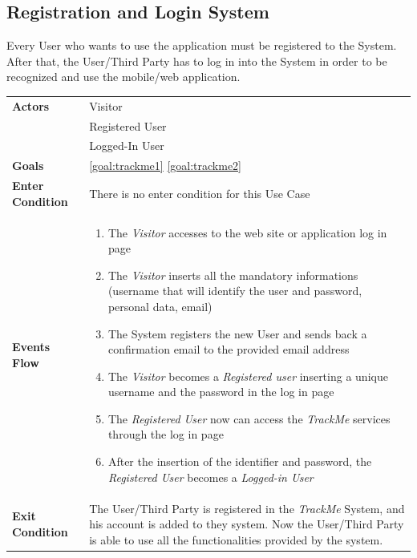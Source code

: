   \subsection{Registration and Login System}
Every User who wants to use the application must be registered to the System.
After that, the User/Third Party has to log in into the System in order to be recognized and use the mobile/web application.

\begin{table}[H]
	\centering
    
    \begin{tabular}{|p{3.5cm}|p{10.3cm}|}
    
    \hline
    \textbf{\large{Actors}}  			& \tabitem Visitor\\
    				 					& \tabitem Registered User\\
                     					& \tabitem Logged-In User\\
    \hline
    \textbf{\large{Goals}} 				& \ref{goal:trackme1}                                                     \ref{goal:trackme2}\\
    
    \hline
    \textbf{\large{Enter Condition}}	& There is no enter condition for this Use Case		\\
    
    \hline
    \textbf{\large{Events Flow}}		& \begin{enumerate}[leftmargin=0.5cm]
                                          	\item The \emph{Visitor}  accesses to the web site or application log in page
                                            \item The \emph{Visitor} inserts all the mandatory informations (username that will identify the user and password, personal data, email)
                                            \item The System registers the new User and sends back a confirmation email to the provided email address
                                            \item The \emph{Visitor} becomes a \emph{Registered user} inserting a unique username and the password in the log in page   
                                            \item The \emph{Registered User} now can access the \emph{TrackMe} services through the log in page
                                            \item After the insertion of the identifier and password, the \emph{Registered User} becomes a \emph{Logged-in User}
                                          \end{enumerate}
    										\\
    \hline
    \textbf{\large{Exit Condition}} 	& The User/Third Party is registered in the \emph{TrackMe} System, and his account is added to they system. Now the User/Third Party is able to use all the functionalities provided by the system. \\
    

\end{tabular}
\end{table}
